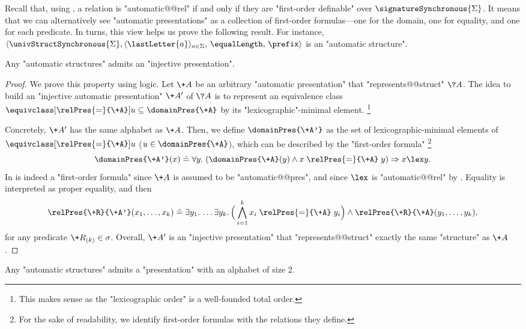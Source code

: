 Recall that, using , a relation is "automatic@@rel" 
if and only if they are "first-order definable" over $\signatureSynchronous{\Sigma}$.
It means that we can alternatively see "automatic presentations" as a
collection of first-order formulas---one for the domain, one for equality, and
one for each predicate. In turns, this view helps us prove the following result.
For instance, $\langle \univStructSynchronous{\Sigma}, \langle\lastLetter{a}\rangle_{a \in \Sigma},\, \equalLength,\, \prefix \rangle$ is an "automatic structure".


\begin{proposition}
	\AP\label{prop:making-presentations-injective}
	Any "automatic structures" admits an "injective presentation".
\end{proposition}

\begin{proof}
	We prove this property using logic. Let $\+A$ be an arbitrary "automatic presentation"
	that "represents@@struct" $\?A$. The idea to build an "injective automatic presentation" $\+A'$
	of $\?A$ is to represent an equivalence class $\equivclass[\relPres{=}{\+A}]{u} \subseteq
	\domainPres{\+A}$ by its "lexicographic"-minimal element.%
	\footnote{This makes sense as the "lexicographic order" is a well-founded total order.}

	Concretely, $\+A'$ has the same alphabet as $\+A$.
	Then, we define $\domainPres{\+A'}$ as the set of lexicographic-minimal elements of
	$\equivclass[\relPres{=}{\+A}]{u}$ ($u \in \domainPres{\+A}$),
	which can be described by the "first-order formula"%
	\footnote{For the sake of readability, we identify first-order formulas with the relations they define.}
	\[
		\domainPres{\+A'}(x) \defeq
		\forall y.\; (\domainPres{\+A}(y) \land x \mathrel{\relPres{=}{\+A}} y) \Rightarrow 
		x \lex y.
	\]
	In is indeed a "first-order formula" since $\+A$ is assumed to be "automatic@@pres",
	and since $\lex$ is "automatic@@rel" by .
	Equality is interpreted as proper equality,
	and then
	\[
		\relPres{\+R}{\+A'}(x_1,\dotsc, x_k) \defeq
		\exists y_1.\,\dotsc \exists y_k.\,
		\Big( \bigwedge_{i=1}^k x_i \mathrel{\relPres{=}{\+A}} y_i \Big)
		\land \relPres{\+R}{\+A}(y_1,\dotsc, y_k),
	\]
	for any predicate $\+R_{(k)} \in \sigma$.
	Overall, $\+A'$ is an "injective presentation" that "represents@@struct" 
	exactly the same "structure" as $\+A$.
\end{proof}

\begin{proposition}
	\AP\label{prop:making-presentations-binary}
	Any "automatic structures" admits a "presentation" with an alphabet of size 2.
\end{proposition}

